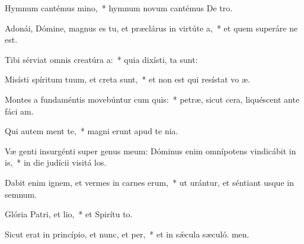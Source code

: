 \item Hymnum cantémus mino,~* hymnum novum cantémus De tro.
\item Adonái, Dómine, magnus es tu, et præclárus in virtúte a,~* et quem superáre ne est.
\item Tibi sérviat omnis creatúra a:~* quia dixísti,  ta sunt:
\item Misísti spíritum tuum, et creta sunt,~* et non est qui resístat vo æ.
\item Montes a fundaméntis movebúntur cum quis:~* petræ, sicut cera, liquéscent ante fáci am.
\item Qui autem ment te,~* magni erunt apud te  nia.
\item Væ genti insurgénti super genus meum: Dóminus enim omnípotens vindicábit in is,~* in die judícii visitá los.
\item Dabit enim ignem, et vermes in carnes erum,~* ut urántur, et séntiant usque in semnum.
\item Glória Patri, et lio,~* et Spirítu to.
\item Sicut erat in princípio, et nunc, et per,~* et in sǽcula sæculó. men.

